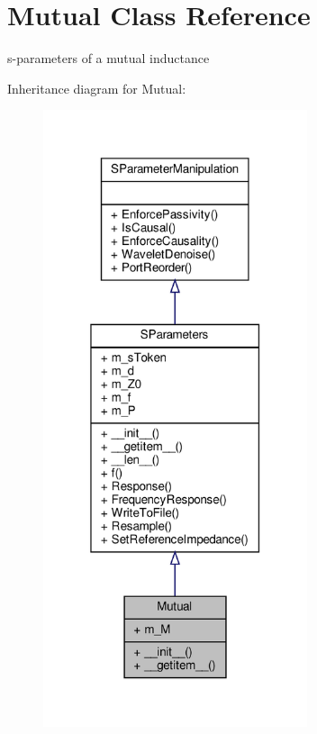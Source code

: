 \hypertarget{classSignalIntegrity_1_1SParameters_1_1Devices_1_1Mutual_1_1Mutual}{}\section{Mutual Class Reference}
\label{classSignalIntegrity_1_1SParameters_1_1Devices_1_1Mutual_1_1Mutual}


s-\/parameters of a mutual inductance  




Inheritance diagram for Mutual\+:\nopagebreak
\begin{figure}[H]
\begin{center}
\leavevmode
\includegraphics[width=220pt]{classSignalIntegrity_1_1SParameters_1_1Devices_1_1Mutual_1_1Mutual__inherit__graph}
\end{center}
\end{figure}


